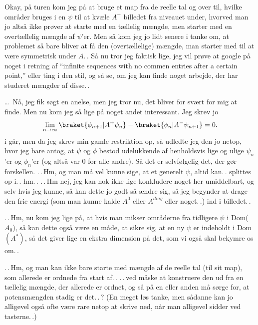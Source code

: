 \documentclass{report}
\begin{document}
Okay, på turen kom jeg på at bruge et map fra de reelle tal og over til, hvilke områder bruges i en $\psi$ til at kvæle $A^+$ billedet fra niveauet under, hvorved man jo altså ikke prøver at starte med en tællelig mængde, men starter med en overtællelig mængde af $\psi$'er. Men så kom jeg jo lidt senere i tanke om, at problemet så bare bliver at få den (overtællelige) mængde, man starter med til at være symmetrisk under $A$.\,. Så nu tror jeg faktisk lige, jeg vil prøve at google på noget i retning af ``infinite sequences with no commen entries after a certain point,'' eller ting i den stil, og så se, om jeg kan finde noget arbejde, der har studeret mængder af disse.\,. 

\ldots\ Nå, jeg fik søgt en anelse, men jeg tror nu, det bliver for svært for mig at finde. Men nu kom jeg så lige på noget andet interessant. Jeg skrev jo
\begin{align}
\begin{aligned}
	\lim_{n\to\infty}
		\braket{\phi_{n+1}| A^+ \psi_{n}} -
		\braket{\phi_{n}| A^- \psi_{n+1}}
		= 0.
\end{aligned}
\end{align}
i går, men da jeg skrev min gamle restriktion op, så udledte jeg den jo netop, hvor jeg bare antog, at $\psi$ og $\phi$ bestod udelukkende af henholdsvis lige og ulige $\psi_n$'er og $\phi_n$'er (og altså var 0 for alle andre). Så det er selvfølgelig det, der gør forskellen. .\,.\,Hm, og man må vel kunne sige, at et generelt $\psi$, altid kan.\,. splittes op i.\,. hm.\,. .\,.\,Hm nej, jeg kan nok ikke lige konkludere noget her umiddelbart, og selv hvis jeg kunne, så kan dette jo godt så ændre sig, så jeg begynder at drage den frie energi (som man kunne kalde $A^0$ eller $A^{diag}$ eller noget.\,.) ind i billedet.\,. 

.\,.\,Hm, nu kom jeg lige på, at hvis man mikser områderne fra tidligere $\psi$ i Dom($A_0$), så kan dette også være en måde, at sikre sig, at en ny $\psi$ er indeholdt i Dom$(A^*)$, så det giver lige en ekstra dimension på det, som vi også skal bekymre os om.\,. 


.\,.\,Hm, og man kan ikke bare starte med mængde af de reelle tal (til sit map), som allerede er ordnede fra start af.\,. .\,.\,ved måske at konstruere den ud fra en tællelig mængde, der allerede er ordnet, og så på en eller anden må sørge for, at potensmængden stadig er det.\,.\,? (En meget løs tanke, men sådanne kan jo alligevel også ofte være rare netop at skrive ned, når man alligevel sidder ved tasterne.\,.) 
\end{document}
